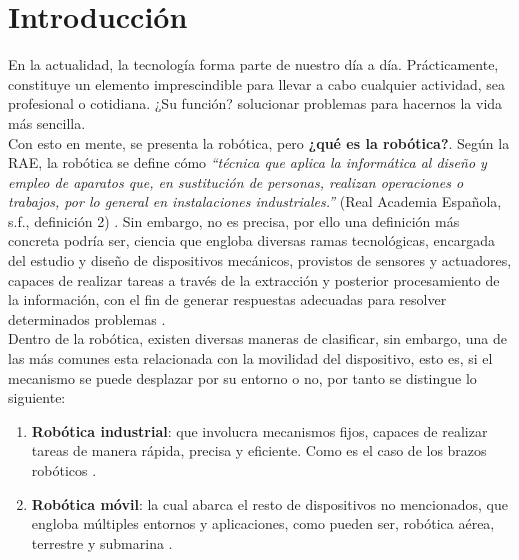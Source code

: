 \chapter{Introducción}
\label{cap:capitulo1}
\setcounter{page}{1}

En la actualidad, la tecnología forma parte de nuestro día a día. Prácticamente, constituye un elemento imprescindible para llevar a cabo cualquier actividad, sea profesional o cotidiana. ¿Su función? solucionar problemas para hacernos la vida más sencilla.\\

Con esto en mente, se presenta la robótica, pero \textbf{¿qué es la robótica?}. Según la \ac{RAE}, la robótica se define cómo \emph{``técnica que aplica la informática al diseño y empleo de aparatos que, en sustitución de personas, realizan operaciones o trabajos, por lo general en instalaciones industriales.''} (Real Academia Española, s.f., definición 2) \cite{rae-robotica}. Sin embargo, no es precisa, por ello una definición más concreta podría ser, ciencia que engloba diversas ramas tecnológicas, encargada del estudio y diseño de dispositivos mecánicos, provistos de sensores y actuadores, capaces de realizar tareas a través de la extracción y posterior procesamiento de la información, con el fin de generar respuestas adecuadas para resolver determinados problemas \cite{revista-de-robots}.\\

Dentro de la robótica, existen diversas maneras de clasificar, sin embargo, una de las más comunes esta relacionada con la movilidad del dispositivo, esto es, si el mecanismo se puede desplazar por su entorno o no, por tanto se distingue lo siguiente:

\begin{enumerate}
	\item \textbf{Robótica industrial}: que involucra mecanismos fijos, capaces de realizar tareas de manera rápida, precisa y eficiente. Como es el caso de los brazos robóticos \cite{industrial-robot}.

	\item \textbf{Robótica móvil}: la cual abarca el resto de dispositivos no mencionados, que engloba múltiples entornos y aplicaciones, como pueden ser, robótica aérea, terrestre y submarina \cite{mobile-robot}.
\end{enumerate}

